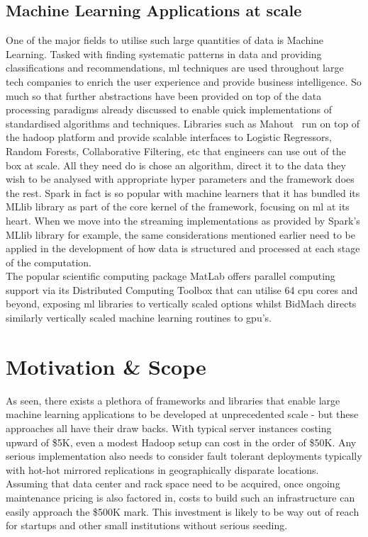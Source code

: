 \documentclass[a4paper,11pt]{scrreprt}
\begin{document}
\section{Machine Learning Applications at scale}
One of the major fields to utilise such large quantities of data is Machine Learning. Tasked with finding systematic patterns in data and providing classifications and recommendations, \acrshort{ml} techniques are used throughout large tech companies to enrich the user experience and provide business intelligence. So much so that further abstractions have been provided on top of the data processing paradigms already discussed to enable quick implementations of standardised algorithms and techniques. Libraries such as Mahout~\cite{mahout-site} run on top of the hadoop platform and provide scalable interfaces to Logistic Regressors, Random Forests, Collaborative Filtering, etc that engineers can use out of the box at scale. All they need do is chose an algorithm, direct it to the data they wish to be analysed with appropriate hyper parameters and the framework does the rest. Spark in fact is so popular with machine learners that it has bundled its MLlib library as part of the core kernel of the framework, focusing on \acrshort{ml} at its heart. When we move into the streaming implementations as provided by Spark's MLlib library for example, the same considerations mentioned earlier need to be applied in the development of how data is structured and processed at each stage of the computation.\\

The popular scientific computing package MatLab offers parallel computing support via its Distributed Computing Toolbox that can utilise 64 \acrshort{cpu} cores and beyond, exposing \acrshort{ml} libraries to vertically scaled options whilst BidMach directs similarly vertically scaled machine learning routines to \acrshort{gpu}'s.

\chapter{Motivation \& Scope}
As seen, there exists a plethora of frameworks and libraries that enable large machine learning applications to be developed at unprecedented scale - but these approaches all have their draw backs. With typical server instances costing upward of \$5K, even a modest Hadoop setup can cost in the order of \$50K. Any serious implementation also needs to consider fault tolerant deployments typically with hot-hot mirrored replications in geographically disparate locations. Assuming that data center and rack space need to be acquired, once ongoing maintenance pricing is also factored in, costs to build such an infrastructure can easily approach the \$500K mark. This investment is likely to be way out of reach for startups and other small institutions without serious seeding.
\end{document}
